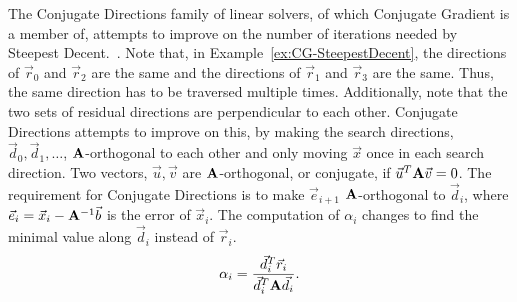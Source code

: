 The Conjugate Directions family of linear solvers, of which Conjugate Gradient is a member of, attempts to improve on the number of iterations needed by Steepest Decent.~\cite{Shewchuk:1994:IntroToCG}.
Note that, in Example~\ref{ex:CG-SteepestDecent}, the directions of \(\vec{r}_0\) and \(\vec{r}_2\) are the same and the directions of \(\vec{r}_1\) and \(\vec{r}_3\) are the same.
Thus, the same direction has to be traversed multiple times.
Additionally, note that the two sets of residual directions are perpendicular to each other.
Conjugate Directions attempts to improve on this, by making the search directions, \(\vec{d}_0, \vec{d}_1, \dots\), \(\mathbf{A}\)-orthogonal to each other and only moving \(\vec{x}\) once in each search direction.
Two vectors, \(\vec{u}, \vec{v}\) are \(\mathbf{A}\)-orthogonal, or conjugate, if \(\vec{u}^T\mathbf{A}\vec{v}=0\).
The requirement for Conjugate Directions is to make \(\vec{e}_{i+1}\) \(\mathbf{A}\)-orthogonal to \(\vec{d}_i\), where \(\vec{e}_i = \vec{x}_i - \mathbf{A}^{-1}\vec{b}\) is the error of \(\vec{x}_i\).
The computation of \(\alpha_i\) changes to find the minimal value along \(\vec{d}_i\) instead of \(\vec{r}_i\).
\[
	\alpha_i = \frac{\vec{d}_i^T\vec{r}_i}{\vec{d}_i^T\mathbf{A}\vec{d}_i}.
\]

